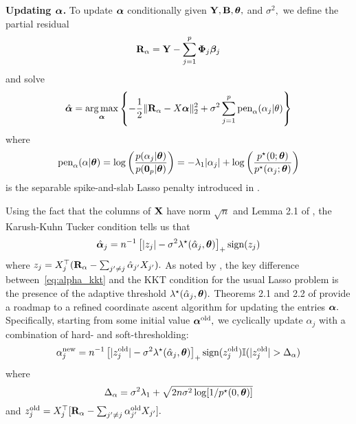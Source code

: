 
\textbf{Updating $\boldsymbol{\alpha}$.}
To update $\boldsymbol{\alpha}$ conditionally given $\mathbf{Y}, \mathbf{B}, \boldsymbol{\theta},$ and $\sigma^{2},$ we define the partial residual
$$
\mathbf{R}_{\alpha} = \mathbf{Y} - \sum_{j = 1}^{p}{\boldsymbol{\Phi}_{j}\boldsymbol{\beta}_{j}}
$$
and solve
$$
\hat{\boldsymbol{\alpha}} = \operatorname*{arg\,max}_{\boldsymbol{\alpha}}\left\{-\frac{1}{2}\lVert \mathbf{R}_{\alpha} - X\boldsymbol{\alpha} \rVert_{2}^{2} + \sigma^{2}\sum_{j = 1}^{p}{\text{pen}_{\alpha}(\alpha_{j} \vert \theta)}\right\}
$$
where 
$$
\text{pen}_{\alpha}(\alpha\vert \boldsymbol{\theta}) = \log\left(\frac{p(\alpha_{j}\vert\boldsymbol{\theta})}{p(\mathbf{0}_{p} \vert \boldsymbol{\theta})}\right) = -\lambda_{1}\lvert \alpha_{j} \rvert + \log{\left(\frac{p^{\star}(0; \boldsymbol{\theta})}{p^{\star}(\alpha_{j}; \boldsymbol{\theta})}\right)}
$$
is the separable spike-and-slab Lasso penalty introduced in \citet{RockovaGeorge2018}.

Using the fact that the columns of $\mathbf{X}$ have norm $\sqrt{n}$ and Lemma 2.1 of \citet{RockovaGeorge2018}, the Karush-Kuhn Tucker condition tells us that
\begin{equation}
\label{eq:alpha_kkt}
\hat{\boldsymbol{\alpha}}_{j} = n^{-1}\left[ \lvert z_{j} \rvert - \sigma^{2}\lambda^{\star}(\hat{\alpha}_{j}, \boldsymbol{\theta}) \right]_{+}\text{sign}(z_{j})
\end{equation}
where $z_{j} = X_{j}^{\top}(\mathbf{R}_{\alpha} - \sum_{j' \neq j}{\hat{\alpha}_{j'}X_{j'}}).$
As noted by \citet{RockovaGeorge2018}, the key difference between~\eqref{eq:alpha_kkt} and the KKT condition for the usual Lasso problem is the presence of the adaptive threshold $\lambda^{\star}(\hat{\alpha}_{j}, \boldsymbol{\theta}).$
Theorems 2.1 and 2.2 of \citet{RockovaGeorge2018} provide a roadmap to a refined coordinate ascent algorithm for updating the entries $\boldsymbol{\alpha}.$
Specifically, starting from some initial value $\boldsymbol{\alpha}^{\text{old}},$ we cyclically update $\alpha_{j}$  with a combination of hard- and soft-thresholding:
$$
\alpha^{\text{new}}_{j} = n^{-1}\left[ \lvert z^{\text{old}}_{j} \rvert - \sigma^{2}\lambda^{\star}(\hat{\alpha}_{j}, \boldsymbol{\theta}) \right]_{+}\text{sign}(z^{\text{old}}_{j}) \mathbb{I}(\lvert z^{\text{old}}_{j} \rvert > \Delta_{\alpha})
$$
where
$$
\Delta_{\alpha} = \sigma^{2}\lambda_{1} + \sqrt{2n\sigma^{2}\log[1/p^{\star}(0, \boldsymbol{\theta})]}
$$
and $z_{j}^{\text{old}} = X_{j}^{\top}[\mathbf{R}_{\alpha} - \sum_{j' \neq j}{\alpha^{\text{old}}_{j'}X_{j'}}].$

